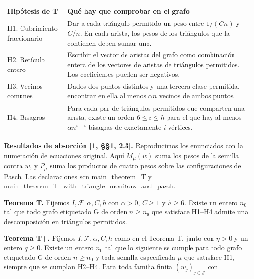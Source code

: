 \documentclass[spanish,11pt,a4paper]{article}
\begin{document}
{\begin{longtable}[]{@{}
  >{\raggedright\arraybackslash}p{}
  >{\raggedright\arraybackslash}p{}@{}}
\toprule\noalign{}
\begin{minipage}[b]{\linewidth}\raggedright
Hipótesis de T
\end{minipage} & \begin{minipage}[b]{\linewidth}\raggedright
Qué hay que comprobar en el grafo
\end{minipage} \\
\midrule\noalign{}
\endhead
\bottomrule\noalign{}
\endlastfoot
H1. Cubrimiento fraccionario & Dar a cada triángulo permitido un peso entre \(1/(Cn)\) y \(C/n\). En cada arista, los pesos de los triángulos que la contienen deben sumar uno. \\
H2. Retículo entero & Escribir el vector de aristas del grafo como combinación entera de los vectores de aristas de triángulos permitidos. Los coeficientes pueden ser negativos. \\
H3. Vecinos comunes & Dados dos puntos distintos y una tercera clase permitida, encontrar en ella al menos \(\alpha n\) vecinos de ambos puntos. \\
H4. Bisagras & Para cada par de triángulos permitidos que comparten una arista, existe un orden \(6\le i\le h\) para el que hay al menos \(\alpha n^{i-4}\) bisagras de exactamente \(i\) vértices. \\
\end{longtable}
}

\textbf{Resultados de absorción {[}1, §§1, 2.3{]}.} Reproducimos los enunciados con la numeración de ecuaciones original. Aquí \(M_\mu(w)\) suma los pesos de la semilla contra \(w\), y \(P_\mu\) suma los productos de cuatro pesos sobre las configuraciones de Pasch. Las declaraciones son main\_theorem\_T y main\_theorem\_T\_with\_triangle\_monitors\_and\_pasch.

\textbf{Teorema T.} Fijemos \(I,\mathcal F,\alpha,C,h\) con \(\alpha>0\), \(C\geq1\) y \(h\geq6\). Existe un entero \(n_0\) tal que todo grafo etiquetado G de orden \(n\geq n_0\) que satisface H1--H4 admite una descomposición en triángulos permitidos.

\textbf{Teorema T+.} Fijemos \(I,\mathcal F,\alpha,C,h\) como en el Teorema T, junto con \(\eta>0\) y un entero \(q\geq0\). Existe un entero \(n_0\) tal que lo siguiente se cumple para todo grafo etiquetado G de orden \(n\geq n_0\) y toda semilla especificada \(\mu\) que satisface H1, siempre que se cumplan H2--H4. Para toda familia finita \((w_j)_{j\in\mathcal J}\) con
\end{document}
